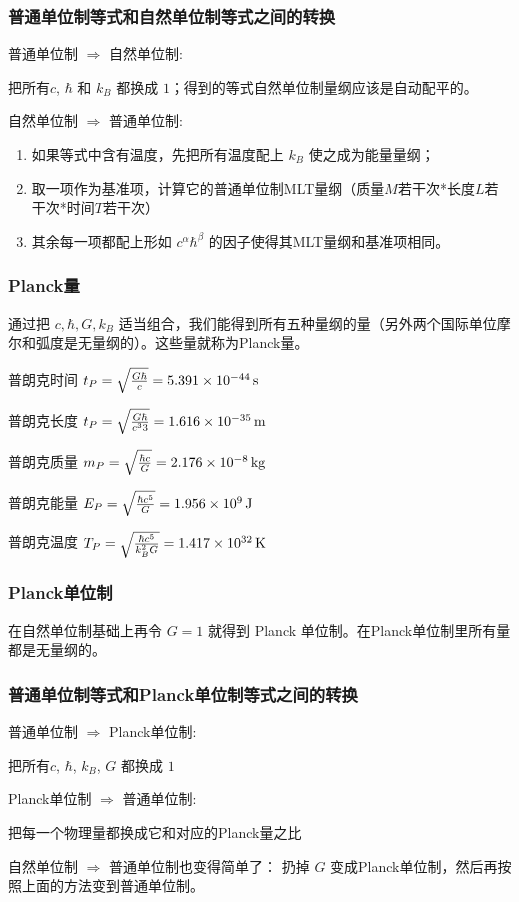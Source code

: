 \documentclass[CJK,13pt]{beamer}
\begin{document}
\begin{frame}
  \frametitle{普通单位制等式和自然单位制等式之间的转换}
  \bitem
\item{普通单位制 $\Rightarrow $ 自然单位制:

  把所有$c$, $\hbar$ 和 $k_B$ 都换成 $1$；得到的等式自然单位制量纲应该是自动配平的。}
\item{自然单位制 $\Rightarrow $ 普通单位制:
  \begin{enumerate}
  \item{如果等式中含有温度，先把所有温度配上 $k_B$ 使之成为能量量纲；}
  \item{取一项作为基准项，计算它的普通单位制MLT量纲（质量$M$若干次*长度$L$若干次*时间$T$若干次）}
  \item{其余每一项都配上形如 $c^\alpha\hbar^\beta$ 的因子使得其MLT量纲和基准项相同。}
\end{enumerate}}
  \eitem
\end{frame}

\begin{frame}
  \frametitle{Planck量}
  通过把 $c, \hbar, G, k_B$ 适当组合，我们能得到所有五种量纲的量（另外两个国际单位摩尔和弧度是无量纲的）。这些量就称为Planck量。

  普朗克时间 $t_P=\sqrt{\frac{G\hbar}{c}} = 5.391\times 10^{-44}\,\mathrm{s}$

  普朗克长度 $t_P=\sqrt{\frac{G\hbar}{c^33}} = 1.616\times 10^{-35}\,\mathrm{m}$  

  普朗克质量 $m_P = \sqrt{\frac{\hbar c}{G}} = 2.176\times 10^{-8}\,\mathrm{kg}$

  普朗克能量 $E_P = \sqrt{\frac{\hbar c^5}{G}} = 1.956\times 10^9 \,\mathrm{J}$

  普朗克温度 $T_P = \sqrt{\frac{\hbar c^5}{k_B^2G}} = 1.417 \times 10^{32}\,\mathrm{K}$
\end{frame}


\begin{frame}
  \frametitle{Planck单位制}
  在自然单位制基础上再令 $G=1$ 就得到 Planck 单位制。在Planck单位制里所有量都是无量纲的。

  \skiplines
  
\end{frame}


\begin{frame}
  \frametitle{普通单位制等式和Planck单位制等式之间的转换}
  \bitem
\item{普通单位制 $\Rightarrow $ Planck单位制:
  
  把所有$c$, $\hbar$, $k_B$, $G$ 都换成 $1$}
\item{Planck单位制 $\Rightarrow $ 普通单位制:
  
  把每一个物理量都换成它和对应的Planck量之比}
  \eitem

  \skiplines

  自然单位制 $\Rightarrow$ 普通单位制也变得简单了： 扔掉 $G$ 变成Planck单位制，然后再按照上面的方法变到普通单位制。
\end{frame}
\end{document}
